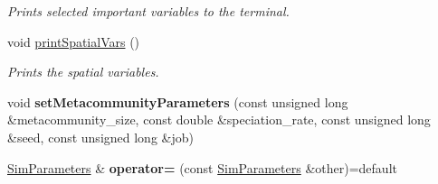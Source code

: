 \begin{DoxyCompactItemize}
\begin{DoxyCompactList}\small\item\em Prints selected important variables to the terminal. \end{DoxyCompactList}\item 
void \hyperlink{struct_sim_parameters_a04636fc2b0899400011b54bb1f175eb0}{print\+Spatial\+Vars} ()\hypertarget{struct_sim_parameters_a04636fc2b0899400011b54bb1f175eb0}{}\label{struct_sim_parameters_a04636fc2b0899400011b54bb1f175eb0}

\begin{DoxyCompactList}\small\item\em Prints the spatial variables. \end{DoxyCompactList}\item 
void {\bfseries set\+Metacommunity\+Parameters} (const unsigned long \&metacommunity\+\_\+size, const double \&speciation\+\_\+rate, const unsigned long \&seed, const unsigned long \&job)\hypertarget{struct_sim_parameters_a8a245d9aef5595c7d3b4e29e3b1a2ef2}{}\label{struct_sim_parameters_a8a245d9aef5595c7d3b4e29e3b1a2ef2}

\item 
\hyperlink{struct_sim_parameters}{Sim\+Parameters} \& {\bfseries operator=} (const \hyperlink{struct_sim_parameters}{Sim\+Parameters} \&other)=default\hypertarget{struct_sim_parameters_ab774f2f5f6221536fcadeb2436abda57}{}\label{struct_sim_parameters_ab774f2f5f6221536fcadeb2436abda57}

\end{DoxyCompactItemize}
